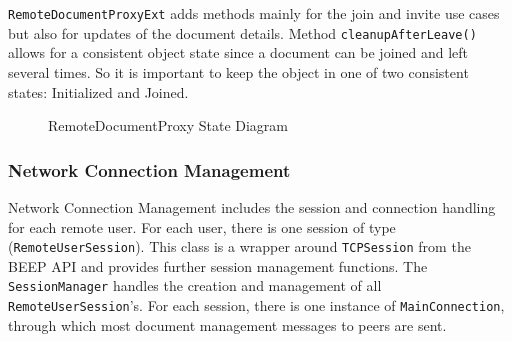 \texttt{RemoteDocumentProxyExt} adds methods mainly for the join and invite use cases but also for updates of the document details. Method  \texttt{cleanupAfterLeave()} allows for a consistent object state since a document can be joined and left several times. So it is important to keep the object in one of two consistent states: Initialized and Joined.  

\begin{figure}[H]
 \centering
 \caption{RemoteDocumentProxy State Diagram}
 \label{fig:network.discovery.remotedocumentproxy.state}
\end{figure}

\subsubsection{Network Connection Management}
Network Connection Management includes the session and connection handling for each remote user. For each user, there is one session of type (\texttt{RemoteUserSession}). This class is a wrapper around \texttt{TCPSession} from the BEEP API and provides further session management functions. The \texttt{Session\-Manager} handles the creation and management of all \texttt{RemoteUserSession}'s. For each session, there is one instance of \texttt{MainConnection}, through which most document management messages to peers are sent. 

